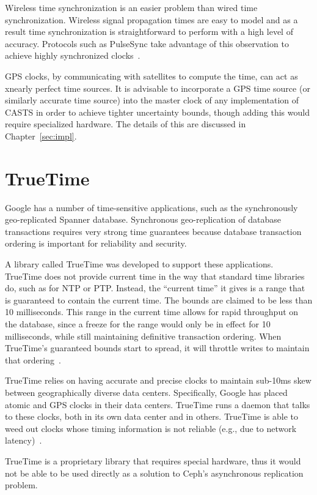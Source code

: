 Wireless time synchronization is an easier problem than wired time 
synchronization. Wireless signal propagation times are easy to model and as a
result time synchronization is straightforward to perform with a high level of
accuracy. Protocols such as PulseSync take advantage of this
observation to achieve highly synchronized clocks~\citep{Lenzen2010}.

GPS clocks, by communicating with satellites to compute the time, can act as 
xnearly perfect time sources. It is
advisable to incorporate a GPS time source (or similarly accurate time
source) into the master clock of any implementation of CASTS
in order to achieve tighter uncertainty bounds, though adding this
would require specialized hardware.  The details of this are discussed
in Chapter~\ref{sec:impl}.

\section{TrueTime}

Google has a number of time-sensitive applications, such as the
synchronously geo-replicated Spanner database. Synchronous
geo-replication of database transactions requires very strong time
guarantees because database transaction ordering is important for
reliability and security.

A library called TrueTime was developed to support these applications.
TrueTime does not provide current time in the way that standard time
libraries do, such as for NTP or PTP. Instead, the ``current time'' it
gives is a range that is guaranteed to contain the current
time. The bounds are claimed to be less than 10
milliseconds. This range in the current time allows for rapid
throughput on the database, since a freeze for the range would only be in effect for 10 milliseconds, while still maintaining definitive
transaction ordering. When TrueTime's guaranteed bounds start to
spread, it will throttle writes to maintain that
ordering~\citep{Corbett2012}.

TrueTime relies on having accurate and precise clocks to
maintain sub-10ms skew between geographically diverse data
centers. Specifically, Google has placed atomic and GPS clocks in
their data centers. TrueTime runs a daemon that talks to these clocks,
both in its own data center and in others. TrueTime is able to weed
out clocks whose timing information is not reliable (e.g., due to
network latency)~\citep{Corbett2012}.

TrueTime is a proprietary library that requires special hardware, thus
it would not be able to be used directly as a solution to Ceph's
asynchronous replication problem.

